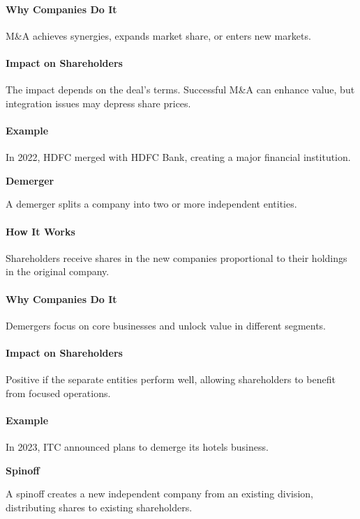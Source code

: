 \documentclass[12pt]{article}
\begin{document}
\paragraph{Why Companies Do It}
M\&A achieves synergies, expands market share, or enters new markets.

\paragraph{Impact on Shareholders}
The impact depends on the deal's terms. Successful M\&A can enhance value, but integration issues may depress share prices.

\paragraph{Example}
In 2022, HDFC merged with HDFC Bank, creating a major financial institution.

\textbf{Demerger}

A demerger splits a company into two or more independent entities.

\paragraph{How It Works}
Shareholders receive shares in the new companies proportional to their holdings in the original company.

\paragraph{Why Companies Do It}
Demergers focus on core businesses and unlock value in different segments.

\paragraph{Impact on Shareholders}
Positive if the separate entities perform well, allowing shareholders to benefit from focused operations.

\paragraph{Example}
In 2023, ITC announced plans to demerge its hotels business.

\textbf{Spinoff}

A spinoff creates a new independent company from an existing division, distributing shares to existing shareholders.
\end{document}
